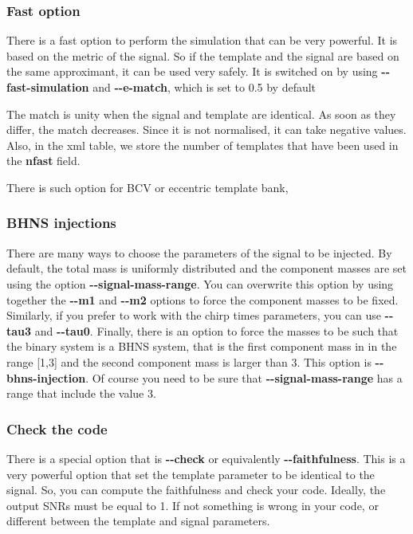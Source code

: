 \documentclass[a4paper,10pt]{article}
\newcommand{\code}[1]{%
\begin{center}
  \fboxsep=10pt
  \fcolorbox{black}{yellow}
  { \parbox[c]{12cm}{ \color{blue}{#1}}}
\end{center}}
\begin{document}
\subsubsection{Fast option}
There is a fast option to perform the simulation that can be very powerful. It is based on the metric of the signal. So if the template and the signal are based on the same approximant, it can be used very safely. It is switched on by using \textbf{{-}{-}fast-simulation} and \textbf{{-}{-}e-match}, which is set to 0.5 by default

\code{./lalapps\_BankEfficiency --fast-simulation --e-match 0.5 --xml-output}


The match is unity when the signal and template are identical. As soon as they differ, the match decreases. Since it is not normalised, it can take negative values. Also, in the xml table, we store the number of templates that have been used in the \textbf{nfast} field.

There is such option for BCV or eccentric template bank,

\subsubsection{BHNS injections}
There are many ways to choose the parameters of the signal to be injected. By default, the total mass is uniformly distributed and the component masses are set using the option \textbf{{-}{-}signal-mass-range}. You can overwrite this option by using together the \textbf{{-}{-}m1} and \textbf{{-}{-}m2} options to force the component masses to be fixed. Similarly, if you prefer to work with the chirp times parameters, you can use 
\textbf{{-}{-}tau3} and \textbf{{-}{-}tau0}. Finally, there is an option to force the masses to be such that the binary system is a BHNS system, that is the first component mass in in the range [1,3] and the second component mass is larger than 3. This option is \textbf{{-}{-}bhns-injection}. Of course you need to be sure that \textbf{{-}{-}signal-mass-range} has a range that include the value 3.

\subsubsection{Check the code}
There is a special option that is \textbf{{-}{-}check} or equivalently \textbf{{}-{-}faithfulness}. This is a very powerful option that set the template parameter to be identical to the signal. So, you can compute the faithfulness and check your code. Ideally, the output SNRs must be equal to 1. If not something is wrong in your code, or different between the template and signal parameters. 
\end{document}
